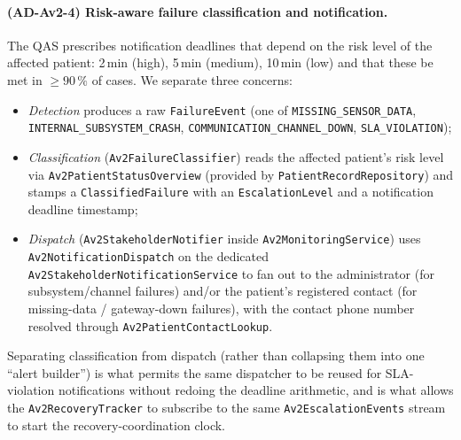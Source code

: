 \paragraph{(AD-Av2-4) Risk-aware failure classification and notification.}
The QAS prescribes notification deadlines that depend on the risk level of
the affected patient: 2\,min (high), 5\,min (medium), 10\,min (low) and
that these be met in $\geq 90\,\%$ of cases. We separate three concerns:
\begin{itemize}
  \item \emph{Detection} produces a raw \texttt{FailureEvent} (one of
        \texttt{MISSING\_SENSOR\_DATA},
        \texttt{INTERNAL\_SUBSYSTEM\_CRASH},
        \texttt{COMMUNICATION\_CHANNEL\_DOWN}, \texttt{SLA\_VIOLATION});
  \item \emph{Classification} (\texttt{Av2FailureClassifier}) reads the
        affected patient's risk level via
        \texttt{Av2PatientStatusOverview} (provided by
        \texttt{PatientRecordRepository}) and stamps a
        \texttt{ClassifiedFailure} with an \texttt{EscalationLevel} and a
        notification deadline timestamp;
  \item \emph{Dispatch} (\texttt{Av2StakeholderNotifier} inside
        \texttt{Av2MonitoringService}) uses \texttt{Av2NotificationDispatch}
        on the dedicated \texttt{Av2StakeholderNotificationService} to fan
        out to the administrator (for subsystem/channel failures) and/or
        the patient's registered contact (for missing-data / gateway-down
        failures), with the contact phone number resolved through
        \texttt{Av2PatientContactLookup}.
\end{itemize}
Separating classification from dispatch (rather than collapsing them into
one ``alert builder'') is what permits the same dispatcher to be reused
for SLA-violation notifications without redoing the deadline arithmetic,
and is what allows the \texttt{Av2RecoveryTracker} to subscribe to the
same \texttt{Av2EscalationEvents} stream to start the recovery-coordination
clock.

